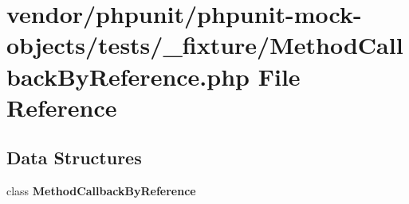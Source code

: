 \section{vendor/phpunit/phpunit-\/mock-\/objects/tests/\+\_\+fixture/\+Method\+Callback\+By\+Reference.php File Reference}
\label{_method_callback_by_reference_8php}
\subsection*{Data Structures}
\begin{DoxyCompactItemize}
\item 
class {\bf Method\+Callback\+By\+Reference}
\end{DoxyCompactItemize}
